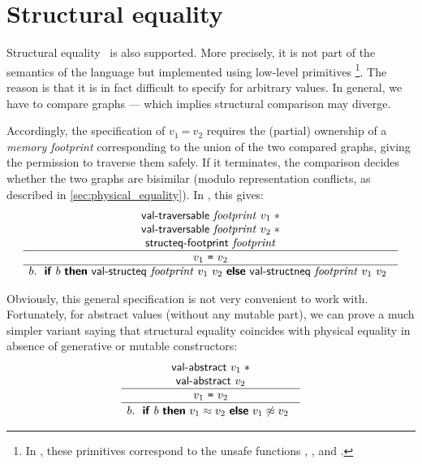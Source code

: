 \section{Structural equality}
\label{sec:structural_equality}

Structural equality~ is also supported.
More precisely, it is not part of the semantics of the language but implemented using low-level primitives%
\footnote{
In \OCaml, these primitives correspond to the unsafe functions , ,  and .
}.
The reason is that it is in fact difficult to specify for arbitrary values.
In general, we have to compare graphs --- which implies structural comparison may diverge.

Accordingly, the specification of $v_1\ \texttt{=}\ v_2$ requires the (partial) ownership of a \emph{memory footprint} corresponding to the union of the two compared graphs, giving the permission to traverse them safely.
If it terminates, the comparison decides whether the two graphs are bisimilar (modulo representation conflicts, as described in \cref{sec:physical_equality}).
In \Iris, this gives:
\[
  \begin{array}{c} \begin{array}{c} 
    \textsf{\upshape val-traversable}\ \mathit{footprint}\ v_1 \mathrel{\ast} \\
    \textsf{\upshape val-traversable}\ \mathit{footprint}\ v_2 \mathrel{\ast} \\
    \textsf{\upshape structeq-footprint}\ \mathit{footprint}
   \end{array} \\ \hline 
    v_1\ \texttt{=}\ v_2
   \\ \hline 
    b
   \ldotp \begin{array}[t]{c} 
    \textsf{\upshape \textbf{if}}\ 
      b
    \ \textsf{\upshape \textbf{then}}\ 
      \textsf{\upshape val-structeq}\ \mathit{footprint}\ v_1\ v_2
    \ \textsf{\upshape \textbf{else}}\ 
      \textsf{\upshape val-structneq}\ \mathit{footprint}\ v_1\ v_2
    
   \end{array} \end{array}
\]

Obviously, this general specification is not very convenient to work with.
Fortunately, for abstract values (without any mutable part), we can prove a much simpler variant saying that structural equality coincides with physical equality in absence of generative or mutable constructors:
\[
  \iSpec{
    \textlog{val-abstract}\ v_1 \iSep \\
    \textlog{val-abstract}\ v_2
  }{
    v_1\ \texttt{=}\ v_2
  }{
    b
  }{
    \myifOneline{
      b
    }{
      v_1 \similar v_2
    }{
      v_1 \nonsimilar v_2
    }
  }
\]

